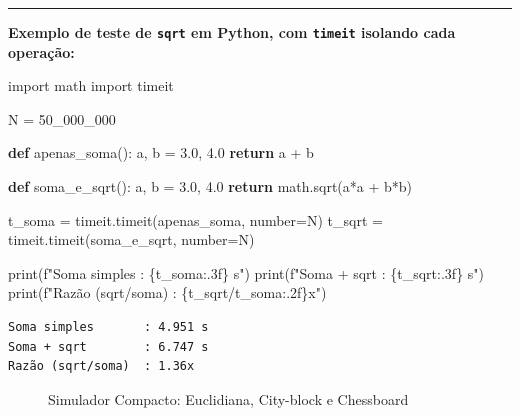 \documentclass[
  portuguese,
  letterpaper,
  openany,
  oneside,
  12pt,
  a4paper]{book}
\newenvironment{Shaded}{\begin{snugshade}}{\end{snugshade}}
\newcommand{\BuiltInTok}[1]{\textcolor[rgb]{0.00,0.23,0.31}{#1}}
\newcommand{\ControlFlowTok}[1]{\textcolor[rgb]{0.00,0.23,0.31}{\textbf{#1}}}
\newcommand{\DecValTok}[1]{\textcolor[rgb]{0.68,0.00,0.00}{#1}}
\newcommand{\FloatTok}[1]{\textcolor[rgb]{0.68,0.00,0.00}{#1}}
\newcommand{\ImportTok}[1]{\textcolor[rgb]{0.00,0.46,0.62}{#1}}
\newcommand{\KeywordTok}[1]{\textcolor[rgb]{0.00,0.23,0.31}{\textbf{#1}}}
\newcommand{\NormalTok}[1]{\textcolor[rgb]{0.00,0.23,0.31}{#1}}
\newcommand{\OperatorTok}[1]{\textcolor[rgb]{0.37,0.37,0.37}{#1}}
\newcommand{\SpecialCharTok}[1]{\textcolor[rgb]{0.37,0.37,0.37}{#1}}
\newcommand{\SpecialStringTok}[1]{\textcolor[rgb]{0.13,0.47,0.30}{#1}}
\begin{document}
\begin{center}\rule{0.5\linewidth}{0.5pt}\end{center}

\textbf{Exemplo de teste de \texttt{sqrt} em Python, com \texttt{timeit}
isolando cada operação:}

\begin{Shaded}
\begin{Highlighting}[]
\ImportTok{import}\NormalTok{ math}
\ImportTok{import}\NormalTok{ timeit}

\NormalTok{N }\OperatorTok{=} \DecValTok{50\_000\_000}

\KeywordTok{def}\NormalTok{ apenas\_soma():}
\NormalTok{    a, b }\OperatorTok{=} \FloatTok{3.0}\NormalTok{, }\FloatTok{4.0}
    \ControlFlowTok{return}\NormalTok{ a }\OperatorTok{+}\NormalTok{ b}

\KeywordTok{def}\NormalTok{ soma\_e\_sqrt():}
\NormalTok{    a, b }\OperatorTok{=} \FloatTok{3.0}\NormalTok{, }\FloatTok{4.0}
    \ControlFlowTok{return}\NormalTok{ math.sqrt(a}\OperatorTok{*}\NormalTok{a }\OperatorTok{+}\NormalTok{ b}\OperatorTok{*}\NormalTok{b)}

\NormalTok{t\_soma }\OperatorTok{=}\NormalTok{ timeit.timeit(apenas\_soma, number}\OperatorTok{=}\NormalTok{N)}
\NormalTok{t\_sqrt }\OperatorTok{=}\NormalTok{ timeit.timeit(soma\_e\_sqrt, number}\OperatorTok{=}\NormalTok{N)}

\BuiltInTok{print}\NormalTok{(}\SpecialStringTok{f"Soma simples       : }\SpecialCharTok{\{}\NormalTok{t\_soma}\SpecialCharTok{:.3f\}}\SpecialStringTok{ s"}\NormalTok{)}
\BuiltInTok{print}\NormalTok{(}\SpecialStringTok{f"Soma + sqrt        : }\SpecialCharTok{\{}\NormalTok{t\_sqrt}\SpecialCharTok{:.3f\}}\SpecialStringTok{ s"}\NormalTok{)}
\BuiltInTok{print}\NormalTok{(}\SpecialStringTok{f"Razão (sqrt/soma)  : }\SpecialCharTok{\{}\NormalTok{t\_sqrt}\OperatorTok{/}\NormalTok{t\_soma}\SpecialCharTok{:.2f\}}\SpecialStringTok{x"}\NormalTok{)}
\end{Highlighting}
\end{Shaded}

\begin{verbatim}
Soma simples       : 4.951 s
Soma + sqrt        : 6.747 s
Razão (sqrt/soma)  : 1.36x
\end{verbatim}

\begin{figure}


\caption{\label{fig-01-metricas-distancia}Simulador Compacto:
Euclidiana, City-block e Chessboard}

\end{figure}%
\end{document}
